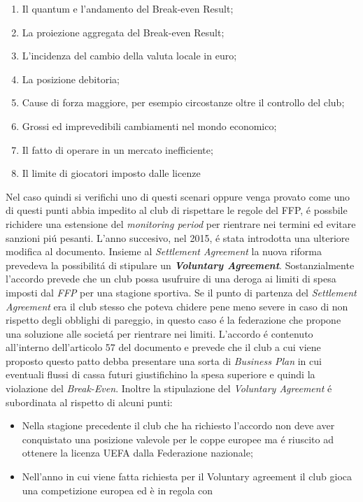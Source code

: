 \documentclass[
    corpo=12pt,
    oneside,
    evenboxes,
    tipotesi=triennale,
    stile=classica,
    oldstyle,
    autoretitolo,
    greek,
]{toptesi}
\begin{document}
\begin{interlinea}{1.5}
\begin{enumerate}
    \item Il quantum e l’andamento del Break-even Result;
    \item La proiezione aggregata del Break-even Result;
    \item L’incidenza del cambio della valuta locale in euro;
    \item La posizione debitoria;
    \item Cause di forza maggiore, per esempio circostanze oltre il controllo del club;
    \item Grossi ed imprevedibili cambiamenti nel mondo economico;
    \item Il fatto di operare in un mercato inefficiente;
    \item Il limite di giocatori imposto dalle licenze
\end{enumerate}
Nel caso quindi si verifichi uno di questi scenari oppure venga provato come uno di questi punti abbia impedito al club di rispettare le 
regole del FFP, \'e possbile richidere una estensione del \emph{monitoring period} per rientrare nei termini ed evitare 
sanzioni pi\'u pesanti.\newline
L'anno succesivo, nel 2015, \'e stata introdotta una ulteriore modifica al documento. Insieme al \emph{Settlement Agreement} la nuova riforma
prevedeva la possibilit\'a di stipulare un \emph{\textbf{Voluntary Agreement}}. Sostanzialmente l'accordo prevede che un club possa usufruire di una
deroga ai limiti di spesa imposti dal \emph{FFP} per una stagione sportiva. Se il punto di partenza del \emph{Settlement Agreement} era il
club stesso che poteva chidere pene meno severe in caso di non rispetto degli obblighi di pareggio, in questo caso \'e la federazione che
propone una soluzione alle societ\'a per rientrare nei limiti. L'accordo \'e contenuto all'interno dell'articolo 57 del documento e prevede 
che il club a cui viene proposto questo patto debba presentare una sorta di \emph{Business Plan} in cui eventuali flussi di cassa futuri 
giustifichino la spesa superiore e quindi la violazione del \emph{Break-Even}. Inoltre la stipulazione del \emph{Voluntary Agreement} \'e
subordinata al rispetto di alcuni punti:
\begin{itemize}
    \item Nella stagione precedente il club che ha richiesto l'accordo non deve aver conquistato una posizione valevole per le coppe
    europee ma \'e riuscito ad ottenere la licenza UEFA dalla Federazione nazionale;
    \item Nell’anno in cui viene fatta richiesta per il Voluntary agreement il club gioca una competizione europea ed è in regola con

\end{itemize}
\end{interlinea}
\end{document}
